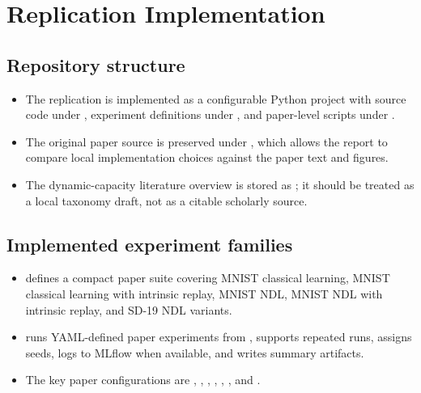 \section{Replication Implementation}

\subsection{Repository structure}
\begin{itemize}
  \item The replication is implemented as a configurable Python project with source code under , experiment definitions under , and paper-level scripts under .
  \item The original paper source is preserved under , which allows the report to compare local implementation choices against the paper text and figures.
  \item The dynamic-capacity literature overview is stored as ; it should be treated as a local taxonomy draft, not as a citable scholarly source.
\end{itemize}

\subsection{Implemented experiment families}
\begin{itemize}
  \item {} defines a compact paper suite covering MNIST classical learning, MNIST classical learning with intrinsic replay, MNIST NDL, MNIST NDL with intrinsic replay, and SD-19 NDL variants.
  \item {} runs YAML-defined paper experiments from , supports repeated runs, assigns seeds, logs to MLflow when available, and writes summary artifacts.
  \item The key paper configurations are , , , , , , and .
\end{itemize}

